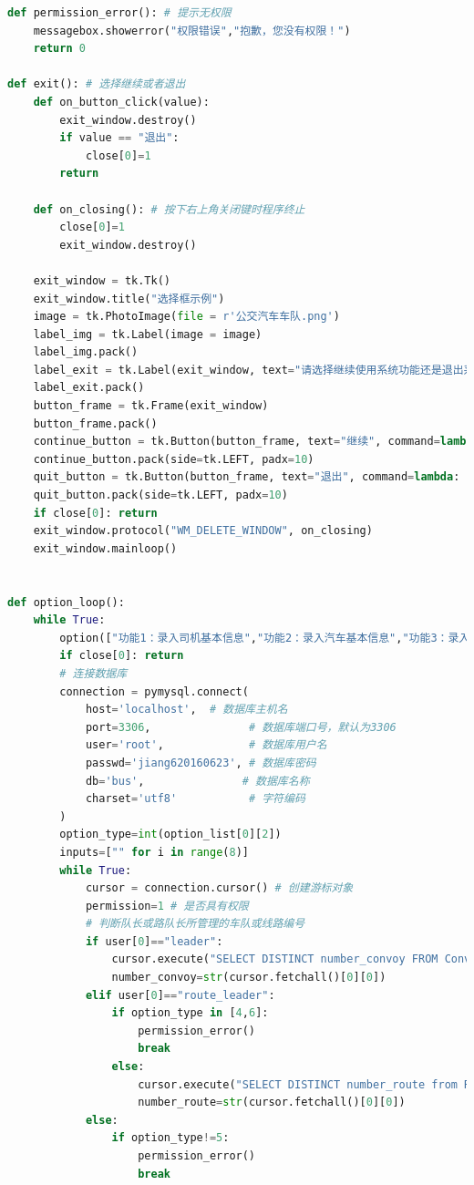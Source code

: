 \documentclass {article}
\begin{document}
\begin{lstlisting}[language=python]
def permission_error(): # 提示无权限
    messagebox.showerror("权限错误","抱歉，您没有权限！")
    return 0

def exit(): # 选择继续或者退出
    def on_button_click(value):
        exit_window.destroy()
        if value == "退出":
            close[0]=1
        return
    
    def on_closing(): # 按下右上角关闭键时程序终止
        close[0]=1
        exit_window.destroy()
        
    exit_window = tk.Tk()
    exit_window.title("选择框示例")
    image = tk.PhotoImage(file = r'公交汽车车队.png')
    label_img = tk.Label(image = image)
    label_img.pack()
    label_exit = tk.Label(exit_window, text="请选择继续使用系统功能还是退出系统")
    label_exit.pack()
    button_frame = tk.Frame(exit_window)
    button_frame.pack()
    continue_button = tk.Button(button_frame, text="继续", command=lambda: on_button_click("继续"))
    continue_button.pack(side=tk.LEFT, padx=10)
    quit_button = tk.Button(button_frame, text="退出", command=lambda: on_button_click("退出"))
    quit_button.pack(side=tk.LEFT, padx=10)
    if close[0]: return
    exit_window.protocol("WM_DELETE_WINDOW", on_closing)
    exit_window.mainloop()
    

def option_loop():
    while True:
        option(["功能1：录入司机基本信息","功能2：录入汽车基本信息","功能3：录入司机的违章信息","功能4：查询某个车队下的司机基本信息","功能5：查询某名司机在某个时间段的违章详细信息","功能6：查询某个车队在某个时间段的违章统计信息"],"请在以下功能按钮中选择你想使用的功能，并点击对应的按钮：")
        if close[0]: return 
        # 连接数据库
        connection = pymysql.connect(
            host='localhost',  # 数据库主机名
            port=3306,               # 数据库端口号，默认为3306
            user='root',             # 数据库用户名
            passwd='jiang620160623', # 数据库密码
            db='bus',               # 数据库名称
            charset='utf8'           # 字符编码
        )
        option_type=int(option_list[0][2])
        inputs=["" for i in range(8)]
        while True:
            cursor = connection.cursor() # 创建游标对象
            permission=1 # 是否具有权限
            # 判断队长或路队长所管理的车队或线路编号
            if user[0]=="leader":
                cursor.execute("SELECT DISTINCT number_convoy FROM Convoy WHERE number_job_leader="+user[1]) # 队长管理的车队编号
                number_convoy=str(cursor.fetchall()[0][0])
            elif user[0]=="route_leader":
                if option_type in [4,6]:
                    permission_error()
                    break
                else: 
                    cursor.execute("SELECT DISTINCT number_route from Route WHERE number_job_routeleader="+user[1]) # 路队长管理的线路编号
                    number_route=str(cursor.fetchall()[0][0])
            else:
                if option_type!=5:
                    permission_error()
                    break


\end{lstlisting}
\end{document}
